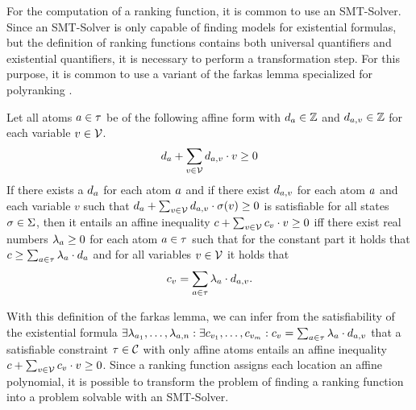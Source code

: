 
For the computation of a ranking function, it is common to use an SMT-Solver.
Since an SMT-Solver is only capable of finding models for existential formulas, but the definition of ranking functions contains both universal quantifiers and existential quantifiers, it is necessary to perform a transformation step.
For this purpose, it is common to use a variant of the farkas lemma \cite{schrijver1998theory} specialized for polyranking \cite{bradley2005polyranking}.

\begin{definition}
  Let all atoms $a \in \tau$ be of the following affine form with $d_a \in \mathbb{Z}$ and $d_{a,v} \in \mathbb{Z}$ for each variable $v \in \mathcal{V}$.
  \[ d_a + \sum_{v \in \mathcal{V}} d_{a,v} \cdot v \geq 0 \]
  If there exists a $d_a$ for each atom $a$ and if there exist $d_{a,v}$ for each atom $a$ and each variable $v$ such that $d_a + \sum_{v \in \mathcal{V}} d_{a,v} \cdot \sigma(v) \geq 0$ is satisfiable for all states $\sigma \in \Sigma$, then it entails an affine inequality $c + \sum_{v \in \mathcal{V}} c_v \cdot v \geq 0$ iff there exist real numbers $\lambda_a \geq 0$ for each atom $a \in \tau$ such that for the constant part it holds that $c \geq \sum_{a \in \tau} \lambda_a \cdot d_a$ and for all variables $v \in \mathcal{V}$ it holds that
  \[ c_v = \sum_{a \in \tau} \lambda_a \cdot d_{a,v}. \]
\end{definition}
With this definition of the farkas lemma, we can infer from the satisfiability of the existential formula $\exists \lambda_{a_1}, \dots, \lambda_{a,n}: \exists c_{v_1}, \dots, c_{v_m}: c_v = \sum_{a \in \tau} \lambda_a \cdot d_{a,v}$ that a satisfiable constraint $\tau \in \mathcal{C}$ with only affine atoms entails an affine inequality $c + \sum_{v \in \mathcal{V}} c_v \cdot v \geq 0$.
Since a ranking function assigns each location an affine polynomial, it is possible to transform the problem of finding a ranking function into a problem solvable with an SMT-Solver.
